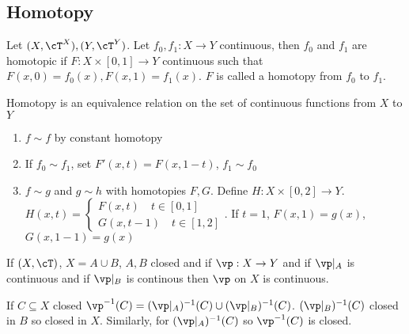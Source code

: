 
\subsection{Homotopy}

\begin{definition}
    Let $(X, \cT^X), (Y, \cT^Y)$. Let $f_0, f_1: X \to Y$ continuous, then $f_0$ and $f_1$ are homotopic if $F: X \times [0,1] \to Y$ continuous such that $F(x,0) = f_0(x), F(x,1)=f_1(x)$. $F$ is called a homotopy from $f_0$ to $f_1$. 
\end{definition}

\begin{proposition}
    Homotopy is an equivalence relation on the set of continuous functions from $X$ to $Y$
\end{proposition}

\begin{pf}
    \begin{enumerate}
        \item $f \sim f$ by constant homotopy 
        \item If $f_0 \sim f_1$, set $F'(x,t) = F(x,1-t)$, $f_1 \sim f_0$ 
        \item $f \sim g$ and $g \sim h$ with homotopies $F, G$. Define $H : X \times [0,2] \to Y$. $H(x,t) = \begin{cases}
            F(x,t) \quad t \in [0,1] \\ G(x,t-1) \quad t \in [1,2] \end{cases}$. If $t = 1$, $F(x,1) = g(x)$, $G(x, 1-1) = g(x)$
    \end{enumerate}
\end{pf}    

\begin{lemma}
    If $(X, \cT)$, $X = A \cup B$, $A, B$ closed and if $\vp: X \to Y$ and if $\vp|_A$ is continuous and if $\vp|_B$ is continous then $\vp$ on $X$ is continuous. 
\end{lemma}

\begin{pf}
    If $C \subseteq X$ closed $\vp^{-1}(C) = (\vp|_A)^{-1}(C) \cup (\vp|_B)^{-1}(C)$. $(\vp|_B)^{-1}(C)$ closed in $B$ so closed in $X$. Similarly, for $(\vp|_A)^{-1}(C)$ so $\vp^{-1}(C)$ is closed. 
\end{pf}